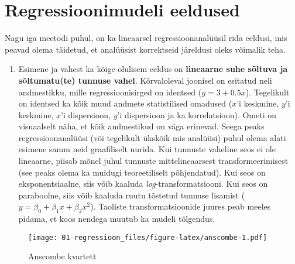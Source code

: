 \documentclass[
]{book}
\providecommand{\tightlist}{%
  \setlength{\itemsep}{0pt}\setlength{\parskip}{0pt}}
\begin{document}
\hypertarget{regressioonimudeli-eeldused}{%
\section{Regressioonimudeli eeldused}\label{regressioonimudeli-eeldused}}

Nagu iga meetodi puhul, on ka lineaarsel regressioonanalüüsil rida eeldusi, mis peavad olema täidetud, et analüüsist korrektseid järeldusi oleks võimalik teha.

\begin{enumerate}
\def\labelenumi{\arabic{enumi}.}
\tightlist
\item
  Esimene ja vahest ka kõige olulisem eeldus on \textbf{lineaarne suhe sõltuva ja sõltumatu(te) tunnuse vahel}. Kõrvaloleval joonisel on esitatud neli andmestikku, mille regressioonisirged on identsed (\(y=3+0.5x\)). Tegelikult on identsed ka kõik muud andmete statistilised omadused (\(x\)'i keskmine, \(y\)'i keskmine, \(x\)'i dispersioon, \(y\)'i dispersioon ja ka korrelatsioon). Ometi on visuaalselt näha, et kõik andmestikud on väga erinevad. Seega peaks regressioonanalüüsi (või tegelikult ükskõik mis analüüsi) puhul olema alati esimene samm neid graafiliselt uurida. Kui tunnuste vaheline seos ei ole lineaarne, piisab mõnel juhul tunnuste mittelineaarsest transformeerimisest (see peaks olema ka muidugi teoreetiliselt põhjendatud). Kui seos on eksponentsiaalne, siis võib kaaluda \emph{log}-transformatsiooni. Kui seos on paraboolne, siis võib kaaluda ruutu tõstetud tunnuse lisamist (\(y = \beta_0+\beta_1x+\beta_2x^2\)). Taoliste transformatsioonide juures peab meeles pidama, et koos nendega muutub ka mudeli tõlgendus.
\end{enumerate}

\begin{figure}
\centering
\texttt{[image: 01-regressioon\_files/figure-latex/anscombe-1.pdf]}
\caption{\label{fig:anscombe}Anscombe kvartett}
\end{figure}
\end{document}
